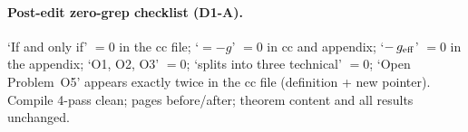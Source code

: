 \paragraph{Post-edit zero-grep checklist (D1-A).}
`If and only if' $=0$ in the cc file; `$= -g$' $=0$ in cc and
appendix; `$-\,g_{\rm eff}$' $=0$ in the appendix;
`O1, O2, O3' $=0$; `splits into three technical' $=0$;
`Open Problem~O5' appears exactly twice in the cc file
(definition + new pointer). Compile 4-pass clean; pages
before/after; theorem content and all results unchanged.
